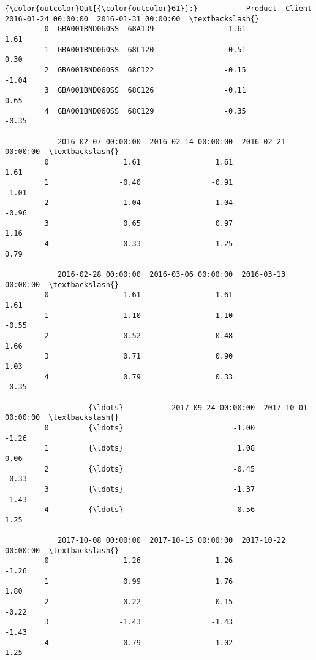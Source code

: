 \documentclass[11pt]{article}
\begin{document}
\begin{Verbatim}[commandchars=\\\{\}]
{\color{outcolor}Out[{\color{outcolor}61}]:}           Product  Client  2016-01-24 00:00:00  2016-01-31 00:00:00  \textbackslash{}
         0  GBA001BND060SS  68A139                 1.61                 1.61   
         1  GBA001BND060SS  68C120                 0.51                 0.30   
         2  GBA001BND060SS  68C122                -0.15                -1.04   
         3  GBA001BND060SS  68C126                -0.11                 0.65   
         4  GBA001BND060SS  68C129                -0.35                -0.35   
         
            2016-02-07 00:00:00  2016-02-14 00:00:00  2016-02-21 00:00:00  \textbackslash{}
         0                 1.61                 1.61                 1.61   
         1                -0.40                -0.91                -1.01   
         2                -1.04                -1.04                -0.96   
         3                 0.65                 0.97                 1.16   
         4                 0.33                 1.25                 0.79   
         
            2016-02-28 00:00:00  2016-03-06 00:00:00  2016-03-13 00:00:00  \textbackslash{}
         0                 1.61                 1.61                 1.61   
         1                -1.10                -1.10                -0.55   
         2                -0.52                 0.48                 1.66   
         3                 0.71                 0.90                 1.03   
         4                 0.79                 0.33                -0.35   
         
                   {\ldots}           2017-09-24 00:00:00  2017-10-01 00:00:00  \textbackslash{}
         0         {\ldots}                         -1.00                -1.26   
         1         {\ldots}                          1.08                 0.06   
         2         {\ldots}                         -0.45                -0.33   
         3         {\ldots}                         -1.37                -1.43   
         4         {\ldots}                          0.56                 1.25   
         
            2017-10-08 00:00:00  2017-10-15 00:00:00  2017-10-22 00:00:00  \textbackslash{}
         0                -1.26                -1.26                -1.26   
         1                 0.99                 1.76                 1.80   
         2                -0.22                -0.15                -0.22   
         3                -1.43                -1.43                -1.43   
         4                 0.79                 1.02                 1.25   
         

\end{Verbatim}
\end{document}
